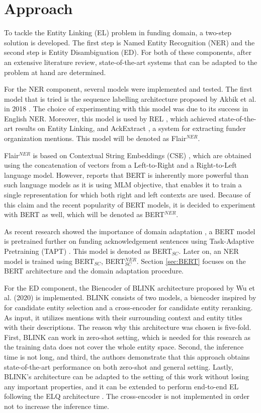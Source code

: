 \documentclass{report}
\theoremstyle{definition}
\theoremstyle{remark}
\begin{document}
\newpage
\chapter{Approach}
\label{chapter:Approach}
To tackle the Entity Linking (EL) problem in funding domain, a two-step solution is developed. The first step is Named Entity Recognition (NER) and the second step is Entity Disambiguation (ED). For both of these components, after an extensive literature review, state-of-the-art systems that can be adapted to the problem at hand are determined.

For the NER component, several models were implemented and tested. The first model that is tried is the sequence labelling architecture proposed by Akbik et al. in 2018 \cite{flairpaper}. The choice of experimenting with this model was due to its success in English NER. Moreover, this model is used by REL \cite{REL}, which achieved state-of-the-art results on Entity Linking, and AckExtract \cite{AckExtract}, a system for extracting funder organization mentions. This model will be denoted as Flair$^{NER}$.

Flair$^{NER}$ is based on Contextual String Embeddings (CSE) \cite{flairpaper}, which are obtained using the concatenation of vectors from a Left-to-Right and a Right-to-Left language model. However, \cite{BERT} reports that BERT is inherently more powerful than such language models as it is using MLM objective, that enables it to train a single representation for which both right and left contexts are used. Because of this claim and the recent popularity of BERT models, it is decided to experiment with BERT as well, which will be denoted as BERT$^{NER}$. 

As recent research showed the importance of domain adaptation \textcolor{red}{\cite{}}, a BERT model is pretrained further on funding acknowledgement sentences using Task-Adaptive Pretraining (TAPT) \cite{DontStop}. This model is denoted as BERT$_{SC}$. Later on, an NER model is trained using BERT$_{SC}$, BERT$_{SC}^{NER}$. Section \ref{sec:BERT} focuses on the BERT architecture and the domain adaptation procedure.

For the ED component, the Biencoder of BLINK architecture proposed by Wu et al. (2020) \cite{scalablezeroshot} is implemented. BLINK consists of two models, a biencoder inspired by \cite{polyencoder} for candidate entity selection and a cross-encoder \cite{polyencoder} for candidate entity reranking. As input, it utilizes mentions with their surrounding context and entity titles with their descriptions. The reason why this architecture was chosen is five-fold. First, BLINK can work in zero-shot setting, which is needed for this research as the training data does not cover the whole entity space. Second, the inference time is not long, and third, the authors demonstrate that this approach obtains state-of-the-art performance on both zero-shot and general setting. Lastly, BLINK's architecture can be adapted to the setting of this work without losing any important properties, and it can be extended to perform end-to-end EL following the ELQ architecture \cite{elq}. The cross-encoder is not implemented in order not to increase the inference time. 
\end{document}
